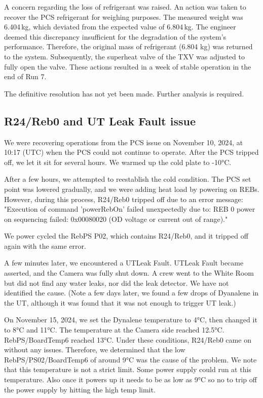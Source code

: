 A concern regarding the loss of refrigerant was raised. An action was taken to recover the PCS refrigerant for weighing purposes. The measured weight was 6.404\,kg, which deviated from the expected value of 6.804\,kg. The engineer deemed this discrepancy insufficient for the degradation of the system's performance. Therefore, the original mass of refrigerant (6.804 kg) was returned to the system. Subsequently, the superheat valve of the TXV was adjusted to fully open the valve. These actions resulted in a week of stable operation in the end of Run 7.

The definitive resolution has not yet been made. Further analysis is required.


\subsection{R24/Reb0 and UT Leak Fault issue}
We were recovering operations from the PCS issue on November 10, 2024, at 10:17 (UTC) when the PCS could not continue to operate. After the PCS tripped off, we let it sit for several hours. We warmed up the cold plate to -10°C.

After a few hours, we attempted to reestablish the cold condition. The PCS set point was lowered gradually, and we were adding heat load by powering on REBs. However, during this process, R24/Reb0 tripped off due to an error message: "Execution of command 'powerRebOn' failed unexpectedly due to: REB 0 power on sequencing failed: 0x00080020 (OD voltage or current out of range)."

We power cycled the RebPS P02, which contains R24/Reb0, and it tripped off again with the same error.

A few minutes later, we encountered a UTLeak Fault. UTLeak Fault became asserted, and the Camera was fully shut down. A crew went to the White Room but did not find any water leaks, nor did the leak detector. We have not identified the cause. (Note a few days later, we found a few drops of Dyanalene in the UT, although it was found that it was not enough to trigger UT leak.)

On November 15, 2024, we set the Dynalene temperature to 4°C, then changed it to 8°C and 11°C. The temperature at the Camera side reached 12.5°C. RebPS/BoardTemp6 reached 13°C. Under these conditions, R24/Reb0 came on without any issues. Therefore, we determined that the low RebPS/PS02/BoardTemp6 of around 9°C was the cause of the problem. We note that this temperature is not a strict limit. Some power supply could run at this temperature. Also once it powers up it needs to be as low as 9°C so no to trip off the power supply by hitting the high temp limit.

